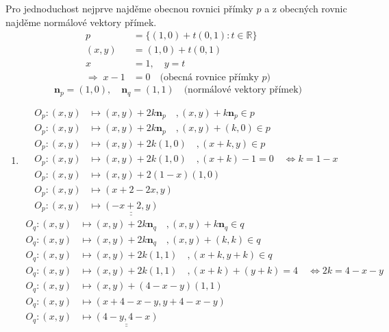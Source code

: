 \documentclass[12pt]{article}
\begin{document}
\begin{enumerate}
    Pro jednoduchost nejprve najděme obecnou rovnici přímky $p$ a z obecných rovnic najděme normálové vektory přímek.
    \begin{align*}
      p &= \{(1, 0) + t(0, 1) : t \in \mathbb{R}\} \\
      (x, y) &= (1, 0) + t(0, 1) \\
      x &= 1, \quad y = t \\
      \Rightarrow\; x - 1 &= 0 \quad \text{(obecná rovnice přímky $p$)}
    \end{align*}
    \[
      \mathbf{n}_p = (1, 0), \quad \mathbf{n}_q = (1, 1) \quad \text{(normálové vektory přímek)}
    \]
    \begin{enumerate}
      \item
      \begin{align*}
        O_p: (x,y) &\mapsto (x,y) + 2k\mathbf{n}_p \quad , (x,y) + k\mathbf{n}_p \in p \\
        O_p: (x,y) &\mapsto (x,y) + 2k\mathbf{n}_p \quad , (x,y) + (k, 0) \in p \\
        O_p: (x,y) &\mapsto (x,y) + 2k(1,0) \quad , (x+k,y) \in p \\
        O_p: (x,y) &\mapsto (x,y) + 2k(1,0) \quad , (x+k)-1=0 \quad \Leftrightarrow k=1-x \\
        O_p: (x,y) &\mapsto (x,y) + 2(1-x)(1,0) \\
        O_p: (x,y) &\mapsto (x+2-2x,y) \\
        O_p: (x,y) &\mapsto \underline{\underline{(-x+2,y)}}
      \end{align*}
      \begin{align*}
        O_q: (x,y) &\mapsto (x,y) + 2k\mathbf{n}_q \quad , (x,y) + k\mathbf{n}_q \in q \\
        O_q: (x,y) &\mapsto (x,y) + 2k\mathbf{n}_q \quad , (x,y) + (k,k) \in q \\
        O_q: (x,y) &\mapsto (x,y) + 2k(1,1) \quad , (x+k,y+k) \in q \\
        O_q: (x,y) &\mapsto (x,y) + 2k(1,1) \quad , (x+k)+(y+k)=4 \quad \Leftrightarrow 2k=4-x-y \\
        O_q: (x,y) &\mapsto (x,y) + (4-x-y)(1,1) \\
        O_q: (x,y) &\mapsto (x+4-x-y, y+4-x-y) \\
        O_q: (x,y) &\mapsto \underline{\underline{(4-y, 4-x)}}
      \end{align*}


\end{enumerate}
\end{enumerate}
\end{document}
